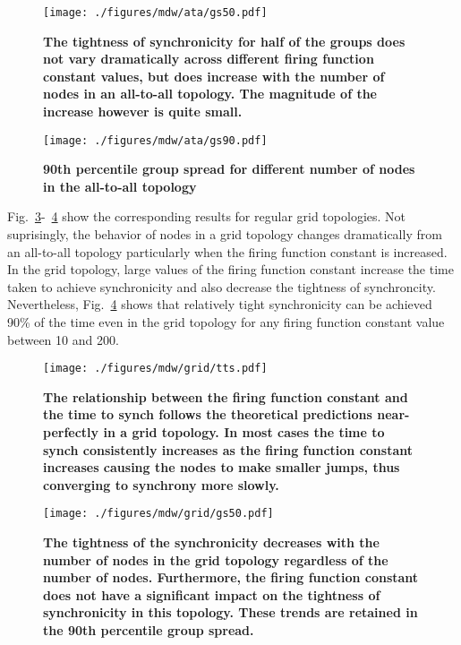 \begin{figure}[p]
\begin{center}
\texttt{[image: ./figures/mdw/ata/gs50.pdf]}
\end{center}
\caption{{\small {\bf The tightness of synchronicity for half of the groups does not vary dramatically across different firing function constant values, but does increase with the number of nodes in an all-to-all topology.  The magnitude of the increase however is quite small.}}}
\label{fig:ata50}
\end{figure}

\begin{figure}[p]
\begin{center}
\texttt{[image: ./figures/mdw/ata/gs90.pdf]}
\end{center}
\caption{{\small {\bf 90th percentile group spread for different number of nodes in the all-to-all topology}}}
\label{fig:ata90}
\end{figure}

Fig.~\ref{fig:gridtts}-~\ref{fig:grid90} show the corresponding results for regular grid topologies.
Not suprisingly, the behavior of nodes in a grid topology changes dramatically from an all-to-all topology particularly
when the firing function constant is increased. In the grid topology, large values of the firing
function constant increase the time taken to achieve synchronicity and also decrease the tightness
of synchroncity. Nevertheless, Fig.~\ref{fig:grid90} shows that relatively tight synchronicity can be
achieved 90\% of the time even in the grid topology for any firing function constant value between 10 and 200.

\begin{figure}[p]
\begin{center}
\texttt{[image: ./figures/mdw/grid/tts.pdf]}
\end{center}
\caption{{\small {\bf The relationship between the firing function constant and the time to synch follows the theoretical predictions near-perfectly in a grid topology. In most cases the time to synch consistently increases as the firing function constant increases causing the nodes to make smaller jumps, thus converging to synchrony more slowly.}}}
\label{fig:gridtts}
\end{figure}

\begin{figure}[p]
\begin{center}
\texttt{[image: ./figures/mdw/grid/gs50.pdf]}
\end{center}
\caption{{\small {\bf The tightness of the synchronicity decreases with the number of nodes in the grid topology regardless of the number of nodes.  Furthermore, the firing function constant does not have a significant impact on the tightness of synchronicity in this topology.  These trends are retained in the 90th percentile group spread.}}}
\label{fig:grid90}
\end{figure}

